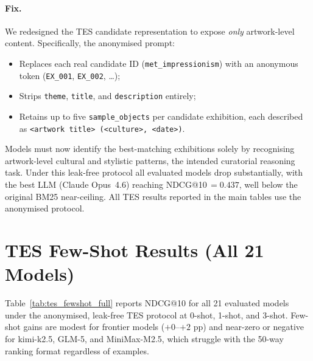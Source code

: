 \documentclass[11pt]{article}
\begin{document}
\paragraph{Fix.}
We redesigned the TES candidate representation to expose \emph{only}
artwork-level content.
Specifically, the anonymised prompt:
\begin{itemize}
  \item Replaces each real candidate ID (\texttt{met\_impressionism}) with an
        anonymous token (\texttt{EX\_001}, \texttt{EX\_002}, \dots);
  \item Strips \texttt{theme}, \texttt{title}, and \texttt{description} entirely;
  \item Retains up to five \texttt{sample\_objects} per candidate exhibition,
        each described as \texttt{<artwork title> (<culture>, <date>)}.
\end{itemize}
Models must now identify the best-matching exhibitions solely by recognising
artwork-level cultural and stylistic patterns, the intended curatorial
reasoning task.
Under this leak-free protocol all evaluated models drop substantially,
with the best LLM (Claude Opus~4.6) reaching NDCG@10\,$=0.437$, well below the
original BM25 near-ceiling.
All TES results reported in the main tables use the anonymised protocol.

\section{TES Few-Shot Results (All 21 Models)}
\label{app:fewshot_full}

Table~\ref{tab:tes_fewshot_full} reports NDCG@10 for all 21 evaluated models
under the anonymised, leak-free TES protocol at 0-shot, 1-shot, and 3-shot.
Few-shot gains are modest for frontier models ($+0$--$+2$ pp) and near-zero
or negative for kimi-k2.5, GLM-5, and MiniMax-M2.5, which struggle with
the 50-way ranking format regardless of examples.
\end{document}
